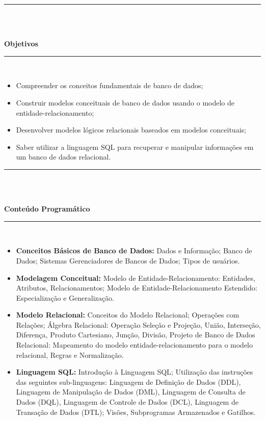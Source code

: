 \noindent\rule{16.5cm}{0.4pt}\\
\\
\vspace{-12mm}
\begin{center}\textbf{Objetivos}\end{center}
\vspace{-5mm}
\noindent\rule{16.5cm}{0.4pt}
\\
\begin{itemize}
\item Compreender os conceitos fundamentais de banco de dados;
\item Construir modelos conceituais de banco de dados usando o modelo de entidade-relacionamento;
\item Desenvolver modelos lógicos relacionais baseados em modelos conceituais;
\item Saber utilizar a linguagem SQL para recuperar e manipular informações em um banco de dados relacional.
\end{itemize}
\noindent\rule{16.5cm}{0.4pt}\\
\\
\vspace{-12mm}
\begin{center}\textbf{Conteúdo Programático}\end{center}
\vspace{-5mm}
\noindent\rule{16.5cm}{0.4pt}
\\
\begin{itemize}
 \item \textbf{Conceitos Básicos de Banco de Dados:} Dados e Informação; Banco de Dados; Sistemas Gerenciadores de Bancos de Dados; Tipos de usuários.
 
 \item \textbf{Modelagem Conceitual:} Modelo de Entidade-Relacionamento: Entidades, Atributos, Relacionamentos; Modelo de Entidade-Relacionamento Estendido: Especialização e Generalização. 

 \item \textbf{Modelo Relacional:} Conceitos do Modelo Relacional; Operações com Relações; Álgebra Relacional: Operação Seleção e Projeção, União, Interseção, Diferença, Produto Cartesiano, Junção, Divisão, Projeto de Banco de Dados Relacional: Mapeamento do modelo entidade-relacionamento para o modelo relacional, Regras e Normalização.
 
 \item \textbf{Linguagem SQL:} Introdução à Linguagem SQL; Utilização das instruções das seguintes sub-linguagens: Linguagem de Definição de Dados (DDL), Linguagem de Manipulação de Dados (DML), Linguagem de Consulta de Dados (DQL), Linguagem de Controle de Dados (DCL), Linguagem de Transação de Dados (DTL); Visões, Subprogramas Armazenados e Gatilhos.

 
\end{itemize}
